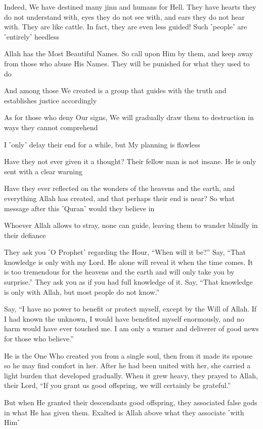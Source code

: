 Indeed, We have destined many jinn and humans for Hell. They have hearts they do not understand with, eyes they do not see with, and ears they do not hear with. They are like cattle. In fact, they are even less guided! Such ˹people˺ are ˹entirely˺ heedless

Allah has the Most Beautiful Names. So call upon Him by them, and keep away from those who abuse His Names. They will be punished for what they used to do

And among those We created is a group that guides with the truth and establishes justice accordingly

As for those who deny Our signs, We will gradually draw them to destruction in ways they cannot comprehend

I ˹only˺ delay their end for a while, but My planning is flawless

Have they not ever given it a thought? Their fellow man is not insane. He is only sent with a clear warning

Have they ever reflected on the wonders of the heavens and the earth, and everything Allah has created, and that perhaps their end is near? So what message after this ˹Quran˺ would they believe in

Whoever Allah allows to stray, none can guide, leaving them to wander blindly in their defiance

They ask you ˹O Prophet˺ regarding the Hour, “When will it be?” Say, “That knowledge is only with my Lord. He alone will reveal it when the time comes. It is too tremendous for the heavens and the earth and will only take you by surprise.” They ask you as if you had full knowledge of it. Say, “That knowledge is only with Allah, but most people do not know.”

Say, “I have no power to benefit or protect myself, except by the Will of Allah. If I had known the unknown, I would have benefited myself enormously, and no harm would have ever touched me. I am only a warner and deliverer of good news for those who believe.”

He is the One Who created you from a single soul, then from it made its spouse so he may find comfort in her. After he had been united with her, she carried a light burden that developed gradually. When it grew heavy, they prayed to Allah, their Lord, “If you grant us good offspring, we will certainly be grateful.”

But when He granted their descendants good offspring, they associated false gods in what He has given them. Exalted is Allah above what they associate ˹with Him˺

